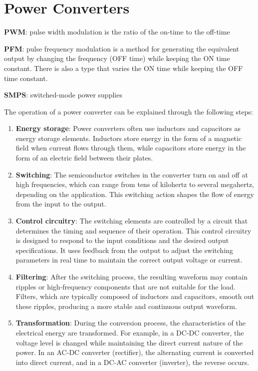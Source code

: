 \chapter{Power Converters}

\begin{pline}
    \item \textbf{PWM}: pulse width modulation is the ratio of the on-time to the off-time
    \item \textbf{PFM}: pulse frequency modulation is a method for generating the equivalent output by changing the frequency (OFF time) while keeping the ON time constant. There is also a type that varies the ON time while keeping the OFF time constant.
    \item \textbf{SMPS}: switched-mode power supplies
\end{pline}

The operation of a power converter can be explained through the following steps:
\begin{enumerate}
    \item \textbf{Energy storage}: Power converters often use inductors and capacitors as energy storage elements. Inductors store energy in the form of a magnetic field when current flows through them, while capacitors store energy in the form of an electric field between their plates.
    \item \textbf{Switching}: The semiconductor switches in the converter turn on and off at high frequencies, which can range from tens of kilohertz to several megahertz, depending on the application. This switching action shapes the flow of energy from the input to the output.
    \item \textbf{Control circuitry}: The switching elements are controlled by a circuit that determines the timing and sequence of their operation. This control circuitry is designed to respond to the input conditions and the desired output specifications. It uses feedback from the output to adjust the switching parameters in real time to maintain the correct output voltage or current.
    \item \textbf{Filtering}: After the switching process, the resulting waveform may contain ripples or high-frequency components that are not suitable for the load. Filters, which are typically composed of inductors and capacitors, smooth out these ripples, producing a more stable and continuous output waveform.
    \item \textbf{Transformation}: During the conversion process, the characteristics of the electrical energy are transformed. For example, in a DC-DC converter, the voltage level is changed while maintaining the direct current nature of the power. In an AC-DC converter (rectifier), the alternating current is converted into direct current, and in a DC-AC converter (inverter), the reverse occurs.
\end{enumerate}

